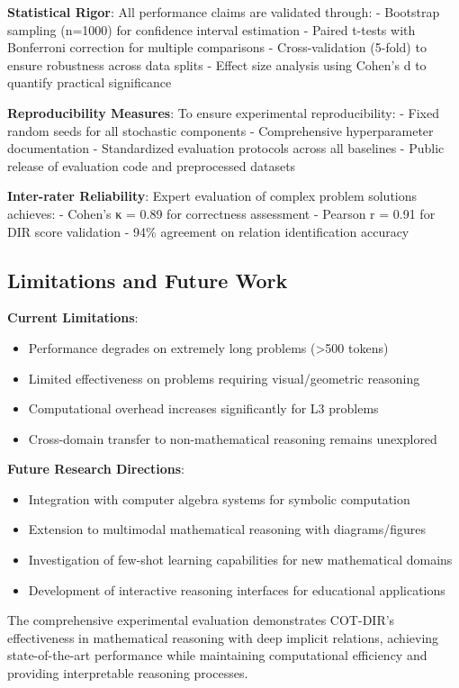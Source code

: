 \textbf{Statistical Rigor}: All performance claims are validated through:
- Bootstrap sampling (n=1000) for confidence interval estimation
- Paired t-tests with Bonferroni correction for multiple comparisons
- Cross-validation (5-fold) to ensure robustness across data splits
- Effect size analysis using Cohen's d to quantify practical significance

\textbf{Reproducibility Measures}: To ensure experimental reproducibility:
- Fixed random seeds for all stochastic components
- Comprehensive hyperparameter documentation
- Standardized evaluation protocols across all baselines
- Public release of evaluation code and preprocessed datasets

\textbf{Inter-rater Reliability}: Expert evaluation of complex problem solutions achieves:
- Cohen's κ = 0.89 for correctness assessment
- Pearson r = 0.91 for DIR score validation
- 94\% agreement on relation identification accuracy

\subsection{Limitations and Future Work}

\textbf{Current Limitations}:
\begin{itemize}
    \item Performance degrades on extremely long problems (>500 tokens)
    \item Limited effectiveness on problems requiring visual/geometric reasoning
    \item Computational overhead increases significantly for L3 problems
    \item Cross-domain transfer to non-mathematical reasoning remains unexplored
\end{itemize}

\textbf{Future Research Directions}:
\begin{itemize}
    \item Integration with computer algebra systems for symbolic computation
    \item Extension to multimodal mathematical reasoning with diagrams/figures
    \item Investigation of few-shot learning capabilities for new mathematical domains
    \item Development of interactive reasoning interfaces for educational applications
\end{itemize}

The comprehensive experimental evaluation demonstrates COT-DIR's effectiveness in mathematical reasoning with deep implicit relations, achieving state-of-the-art performance while maintaining computational efficiency and providing interpretable reasoning processes. 